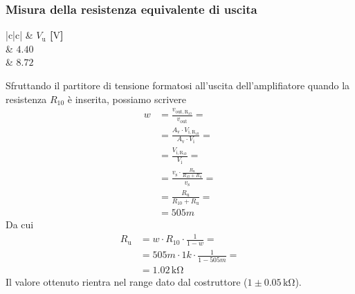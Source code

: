 \documentclass[a4paper]{article}
\begin{document}
			\subsubsection{Misura della resistenza equivalente di uscita}	
				\begin{center}
					\begin{tabular}{ |c|c| }
						\hline
						\multirow{} 						  & \textbf{$ V_{\mathrm{u}} $ [$ \mathrm{V} $]} \\
						\hline
								  & $ 4.40 $ \\
						 & $ 8.72 $ \\
						\hline
					\end{tabular}
				\end{center}
				Sfruttando il partitore di tensione formatosi all'uscita dell'amplifiatore quando la resistenza $ R_{10} $ è inserita, possiamo scrivere
				\begin{equation*}
					\begin{split}
						w &= \frac{v_{\mathrm{out,R_{10}}}}{v_{\mathrm{out}}} = \\
						  &= \frac{A_{\mathrm{v}} \cdot V_{\mathrm{i,R_{10}}}}{A_{\mathrm{v}} \cdot V_{\mathrm{i}}} = \\
						  &= \frac{V_{\mathrm{i,R_{10}}}}{V_{\mathrm{i}}} = \\
						  &= \frac{v_{\mathrm{s}} \cdot \frac{R_{\mathrm{u}}}{R_{10} + R_{\mathrm{u}}}}{v_{\mathrm{s}}} = \\
						  &= \frac{R_{\mathrm{u}}}{R_{10} + R_{\mathrm{u}}} = \\
						  &= 505m
					\end{split}
				\end{equation*}
				Da cui
				\begin{equation*}
					\begin{split}
						R_{\mathrm{u}} &= w \cdot R_{10} \cdot \frac{1}{1 - w} = \\
									   &= 505m \cdot 1k \cdot \frac{1}{1 - 505m} = \\
									   &= 1.02 \, \mathrm{k\Omega}
					\end{split}
				\end{equation*}
				Il valore ottenuto rientra nel range dato dal costruttore ($ 1 \pm 0.05 \, \mathrm{k\Omega} $).
\end{document}
